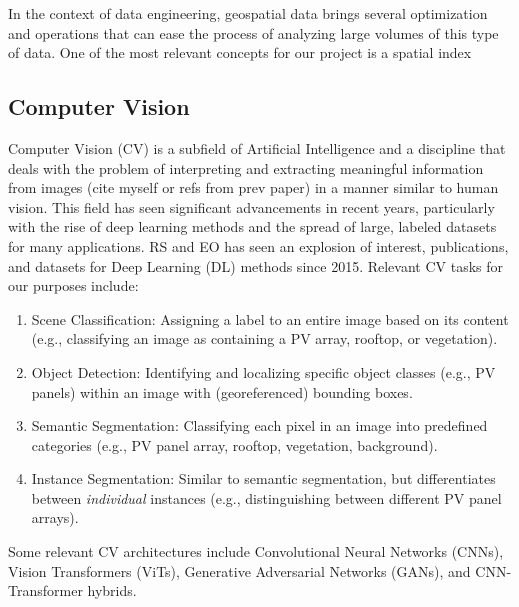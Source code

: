 \begin{multicols}{2}
In the context of data engineering, geospatial data brings several optimization and operations that can ease the process of analyzing large volumes of this type of data.
One of the most relevant concepts for our project is a spatial index 


\subsection{Computer Vision}

Computer Vision (CV) is a subfield of Artificial Intelligence and a discipline that deals with the problem of interpreting and extracting meaningful information from images (cite myself or refs from prev paper) 
in a manner similar to human vision. This field has seen significant advancements in recent years, particularly with the rise of deep learning methods and the spread of large, labeled datasets for many applications. 
RS and EO has seen an explosion of interest, publications, and datasets for Deep Learning (DL) methods since 2015\cite{schmitt_datasets_DL_EO_2023}. Relevant CV tasks for our purposes include:

\begin{enumerate}
    \item Scene Classification: Assigning a label to an entire image based on its content (e.g., classifying an image as containing a PV array, rooftop, or vegetation).
    \item Object Detection: Identifying and localizing specific object classes (e.g., PV panels) within an image with (georeferenced) bounding boxes.
    \item Semantic Segmentation: Classifying each pixel in an image into predefined categories (e.g., PV panel array, rooftop, vegetation, background).
    \item Instance Segmentation: Similar to semantic segmentation, but differentiates between \textit{individual} instances (e.g., distinguishing between different PV panel arrays). 
\end{enumerate}

Some relevant CV architectures include Convolutional Neural Networks (CNNs), Vision Transformers (ViTs), Generative Adversarial Networks (GANs), and CNN-Transformer hybrids. 



\end{multicols}
